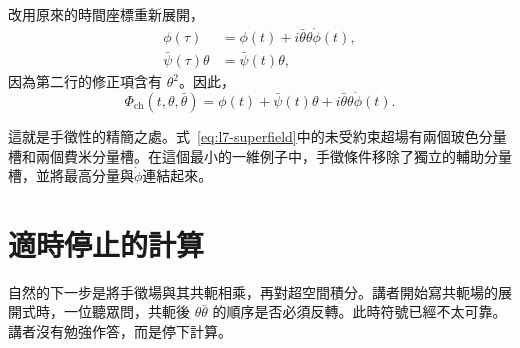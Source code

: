 \begin{classroomqa}
\end{classroomqa}

改用原來的時間座標重新展開，
\begin{align}
\phi(\tau)
&=\phi(t)+i\bar\theta\theta\dot\phi(t),\\
\bar\psi(\tau)\theta
&=\bar\psi(t)\theta,
\end{align}
因為第二行的修正項含有 \(\theta^2\)。因此，
\begin{equation}
\Phi_{\mathrm{ch}}(t,\theta,\bar\theta)
=\phi(t)+\bar\psi(t)\theta
+i\bar\theta\theta\dot\phi(t).
\label{eq:l7-chiral-field-components}
\end{equation}

\begin{classroomqa}
\end{classroomqa}

這就是手徵性的精簡之處。式~\eqref{eq:l7-superfield}中的未受約束超場有兩個玻色分量槽和兩個費米分量槽。在這個最小的一維例子中，手徵條件移除了獨立的輔助分量槽，並將最高分量與\(\dot\phi\)連結起來。

\section{適時停止的計算}

自然的下一步是將手徵場與其共軛相乘，再對超空間積分。講者開始寫共軛場的展開式時，一位聽眾問，共軛後 \(\theta\bar\theta\) 的順序是否必須反轉。此時符號已經不太可靠。講者沒有勉強作答，而是停下計算。

\begin{classroomqa}
\end{classroomqa}

